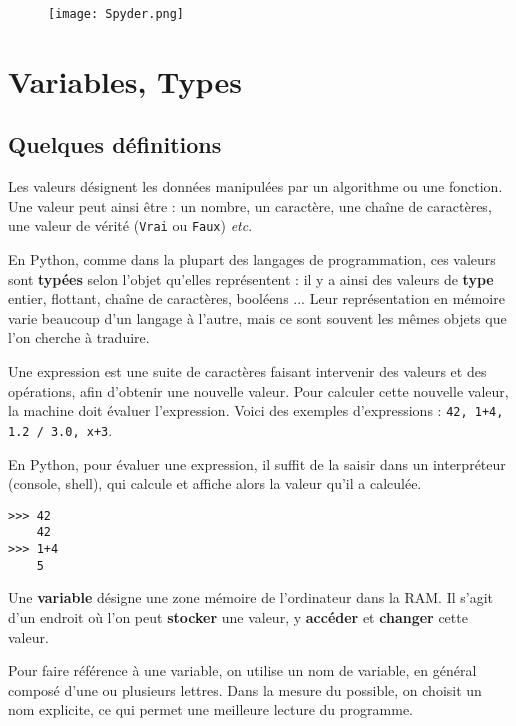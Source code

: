 \begin{figure}[H]
\centering
\texttt{[image: Spyder.png]}
\end{figure}

\section{Variables, Types}

\subsection{Quelques définitions}
\begin{defi}[Valeurs]
Les valeurs désignent les données manipulées par un algorithme ou une fonction. Une valeur 
peut ainsi être  : un nombre, un caractère, une chaîne de caractères, une valeur de vérité 
(\texttt{Vrai} ou \texttt{Faux}) \textit{etc}.

En Python, comme dans la plupart des langages de programmation, ces valeurs sont \textbf{typées} selon l'objet qu'elles représentent : il y a ainsi des valeurs de \textbf{type} entier, flottant, chaîne de caractères, booléens ...   Leur représentation en mémoire varie beaucoup d'un langage à l'autre, mais ce sont souvent les mêmes objets que l'on 
cherche à traduire.
\end{defi}

\begin{defi}[Expression]
Une expression est une suite de caractères faisant intervenir des valeurs et des 
opérations, afin d'obtenir une nouvelle valeur. Pour calculer cette nouvelle valeur,
la machine doit {évaluer} l'expression. Voici des exemples d'expressions : \texttt{42, 1+4, 
1.2 / 3.0, x+3}.
\end{defi}

En Python, pour évaluer une expression, il suffit de la saisir dans un interpréteur (console, shell), qui
calcule et affiche alors la valeur qu'il a calculée.
\begin{lstlisting}
>>> 42
	42
>>> 1+4
	5
\end{lstlisting}


\begin{defi}[Variable]
Une \textbf{variable} désigne une zone mémoire de l'ordinateur dans la RAM.
Il s'agit d'un endroit où l'on peut \textbf{stocker} une valeur, y \textbf{accéder} et 
\textbf{changer} cette valeur.

Pour faire référence à une variable, on utilise un nom de variable, en général composé d'une ou 
plusieurs lettres. Dans la mesure du possible, on choisit un nom explicite, ce qui permet une 
meilleure lecture du programme.
\end{defi}






